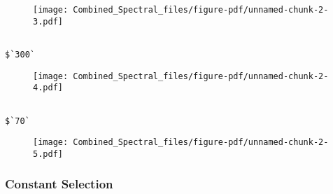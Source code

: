 \documentclass[
  letterpaper,
  DIV=11,
  numbers=noendperiod]{scrartcl}
\newenvironment{Shaded}{\begin{snugshade}}{\end{snugshade}}
\newcommand{\FunctionTok}[1]{\textcolor[rgb]{0.28,0.35,0.67}{#1}}
\newcommand{\NormalTok}[1]{\textcolor[rgb]{0.00,0.23,0.31}{#1}}
\newcommand{\OtherTok}[1]{\textcolor[rgb]{0.00,0.23,0.31}{#1}}
\newcommand{\SpecialCharTok}[1]{\textcolor[rgb]{0.37,0.37,0.37}{#1}}
\newcommand{\StringTok}[1]{\textcolor[rgb]{0.13,0.47,0.30}{#1}}
\begin{document}
\begin{figure}[H]

{\centering \texttt{[image: Combined\_Spectral\_files/figure-pdf/unnamed-chunk-2-3.pdf]}

}

\end{figure}

\begin{verbatim}

$`300`
\end{verbatim}

\begin{figure}[H]

{\centering \texttt{[image: Combined\_Spectral\_files/figure-pdf/unnamed-chunk-2-4.pdf]}

}

\end{figure}

\begin{verbatim}

$`70`
\end{verbatim}

\begin{figure}[H]

{\centering \texttt{[image: Combined\_Spectral\_files/figure-pdf/unnamed-chunk-2-5.pdf]}

}

\end{figure}

\hypertarget{constant-selection}{%
\subsubsection{Constant Selection}\label{constant-selection}}

\begin{Shaded}
\end{Shaded}
\end{document}
